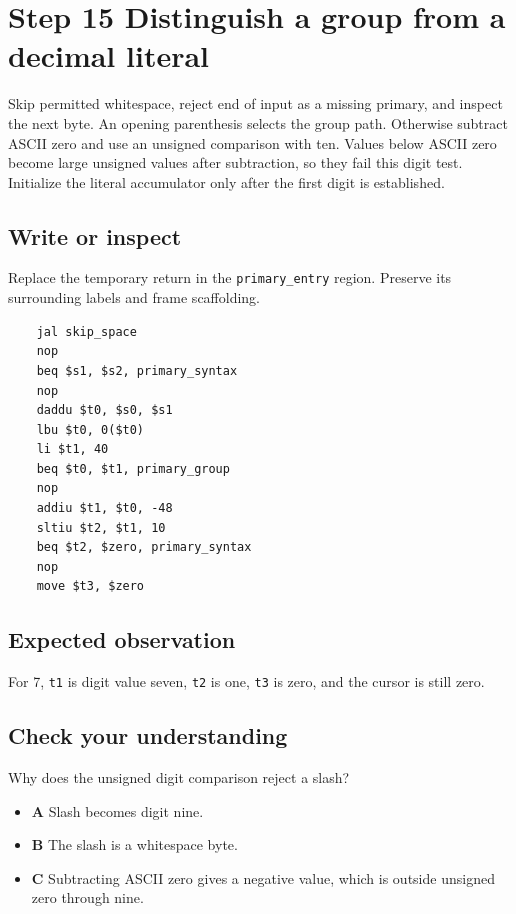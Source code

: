 \section{Step 15 Distinguish a group from a decimal literal}\label{expression-s15}

Skip permitted whitespace, reject end of input as a missing primary, and inspect the next byte. An opening parenthesis selects the group path. Otherwise subtract ASCII zero and use an unsigned comparison with ten. Values below ASCII zero become large unsigned values after subtraction, so they fail this digit test. Initialize the literal accumulator only after the first digit is established.

\subsection{Write or inspect}
Replace the temporary return in the \texttt{primary\_entry} region. Preserve its surrounding labels and frame scaffolding.

\begin{verbatim}
    jal skip_space
    nop
    beq $s1, $s2, primary_syntax
    nop
    daddu $t0, $s0, $s1
    lbu $t0, 0($t0)
    li $t1, 40
    beq $t0, $t1, primary_group
    nop
    addiu $t1, $t0, -48
    sltiu $t2, $t1, 10
    beq $t2, $zero, primary_syntax
    nop
    move $t3, $zero
\end{verbatim}
\subsection{Expected observation}
For 7, \texttt{t1} is digit value seven, \texttt{t2} is one, \texttt{t3} is zero, and the cursor is still zero.

\subsection{Check your understanding}
Why does the unsigned digit comparison reject a slash?

\begin{itemize}
  \item \textbf{A} Slash becomes digit nine.
  \item \textbf{B} The slash is a whitespace byte.
  \item \textbf{C} Subtracting ASCII zero gives a negative value, which is outside unsigned zero through nine.
\end{itemize}
